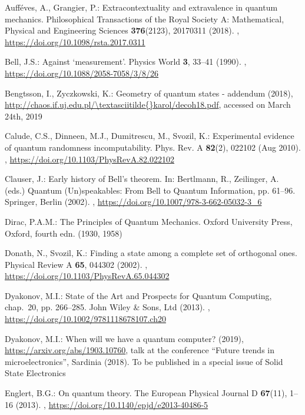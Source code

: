 \documentclass[runningheads]{llncs}
\begin{document}
\begin{thebibliography}{10}
Auff\'eves, A., Grangier, P.: Extracontextuality and extravalence in quantum
  mechanics. Philosophical Transactions of the Royal Society {A}: Mathematical,
  Physical and Engineering Sciences  \textbf{376}(2123),  20170311 (2018).
  , \url{https://doi.org/10.1098/rsta.2017.0311}

Bell, J.S.: Against `measurement'. Physics World  \textbf{3},  33--41 (1990).
  ,
  \url{https://doi.org/10.1088/2058-7058/3/8/26}

Bengtsson, I., Zyczkowski, K.: Geometry of quantum states - addendum (2018),
  \url{http://chaos.if.uj.edu.pl/\textasciitilde{}karol/decoh18.pdf}, accessed
  on March 24th, 2019

Calude, C.S., Dinneen, M.J., Dumitrescu, M., Svozil, K.: Experimental evidence
  of quantum randomness incomputability. Phys. Rev. A  \textbf{82}(2),  022102
  (Aug 2010). ,
  \url{https://doi.org/10.1103/PhysRevA.82.022102}

Clauser, J.: Early history of {B}ell's theorem. In: Bertlmann, R., Zeilinger,
  A. (eds.) Quantum (Un)speakables: {F}rom {B}ell to Quantum Information, pp.
  61--96. Springer, Berlin (2002). ,
  \url{https://doi.org/10.1007/978-3-662-05032-3\_6}

Dirac, P.A.M.: The Principles of Quantum Mechanics. Oxford University Press,
  Oxford, fourth edn. (1930, 1958)

Donath, N., Svozil, K.: Finding a state among a complete set of orthogonal
  ones. Physical Review A  \textbf{65},  044302 (2002).
  ,
  \url{https://doi.org/10.1103/PhysRevA.65.044302}

Dyakonov, M.I.: State of the Art and Prospects for Quantum Computing, chap.~20,
  pp. 266--285. John Wiley \& Sons, Ltd (2013).
  ,
  \url{https://doi.org/10.1002/9781118678107.ch20}

Dyakonov, M.I.: When will we have a quantum computer? (2019),
  \url{https://arxiv.org/abs/1903.10760}, talk at the conference ``Future
  trends in microelectronics'', Sardinia (2018). To be published in a special
  issue of Solid State Electronics

Englert, B.G.: On quantum theory. The European Physical Journal D
  \textbf{67}(11),  1--16 (2013). ,
  \url{https://doi.org/10.1140/epjd/e2013-40486-5}


\end{thebibliography}
\end{document}
